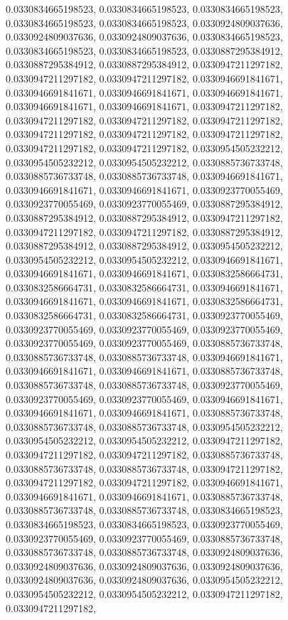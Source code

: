 \documentclass[
  ,man]{apa6}
\begin{document}
0.0330834665198523, 0.0330834665198523, 0.0330834665198523, 0.0330834665198523, 0.0330834665198523, 0.0330924809037636, 0.0330924809037636, 0.0330924809037636, 0.0330834665198523, 0.0330834665198523, 0.0330834665198523, 0.0330887295384912, 0.0330887295384912, 0.0330887295384912, 0.0330947211297182, 0.0330947211297182, 0.0330947211297182, 0.0330946691841671, 0.0330946691841671, 0.0330946691841671, 0.0330946691841671, 0.0330946691841671, 0.0330946691841671, 0.0330947211297182, 0.0330947211297182, 0.0330947211297182,
0.0330947211297182, 0.0330947211297182, 0.0330947211297182, 0.0330947211297182, 0.0330947211297182, 0.0330947211297182, 0.0330954505232212, 0.0330954505232212, 0.0330954505232212, 0.0330885736733748, 0.0330885736733748, 0.0330885736733748, 0.0330946691841671, 0.0330946691841671, 0.0330946691841671, 0.0330923770055469, 0.0330923770055469, 0.0330923770055469, 0.0330887295384912, 0.0330887295384912, 0.0330887295384912, 0.0330947211297182, 0.0330947211297182, 0.0330947211297182, 0.0330887295384912, 0.0330887295384912,
0.0330887295384912, 0.0330954505232212, 0.0330954505232212, 0.0330954505232212, 0.0330946691841671, 0.0330946691841671, 0.0330946691841671, 0.0330832586664731, 0.0330832586664731, 0.0330832586664731, 0.0330946691841671, 0.0330946691841671, 0.0330946691841671, 0.0330832586664731, 0.0330832586664731, 0.0330832586664731, 0.0330923770055469, 0.0330923770055469, 0.0330923770055469, 0.0330923770055469, 0.0330923770055469, 0.0330923770055469, 0.0330885736733748, 0.0330885736733748, 0.0330885736733748, 0.0330946691841671,
0.0330946691841671, 0.0330946691841671, 0.0330885736733748, 0.0330885736733748, 0.0330885736733748, 0.0330923770055469, 0.0330923770055469, 0.0330923770055469, 0.0330946691841671, 0.0330946691841671, 0.0330946691841671, 0.0330885736733748, 0.0330885736733748, 0.0330885736733748, 0.0330954505232212, 0.0330954505232212, 0.0330954505232212, 0.0330947211297182, 0.0330947211297182, 0.0330947211297182, 0.0330885736733748, 0.0330885736733748, 0.0330885736733748, 0.0330947211297182, 0.0330947211297182, 0.0330947211297182,
0.0330946691841671, 0.0330946691841671, 0.0330946691841671, 0.0330885736733748, 0.0330885736733748, 0.0330885736733748, 0.0330834665198523, 0.0330834665198523, 0.0330834665198523, 0.0330923770055469, 0.0330923770055469, 0.0330923770055469, 0.0330885736733748, 0.0330885736733748, 0.0330885736733748, 0.0330924809037636, 0.0330924809037636, 0.0330924809037636, 0.0330924809037636, 0.0330924809037636, 0.0330924809037636, 0.0330954505232212, 0.0330954505232212, 0.0330954505232212, 0.0330947211297182, 0.0330947211297182,
\end{document}
